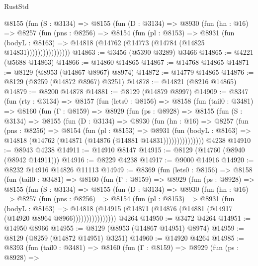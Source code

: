 \begin{lexlean}{RustStd}
\begin{coremodule}
              @8155
                (fun (S : @3134) =>
                @8155
                  (fun (D : @3134) =>
                  @8930
                    (fun (hn : @16) =>
                    @8257
                      (fun (pns : @8256) =>
                      @8154
                        (fun (pl : @8153) =>
                        @8931
                          (fun (bodyL : @8163) =>
                          @14818 (@14762 (@14773 (@14784 (@14825 @14831))))))))))))))))
@14863 := @3456 (@5390 @3289) @3466
@14865 := @4221 (@5688 @14863)
@14866 := @14860 @14865
@14867 := @14768 @14865
@14871 := @8129 (@8953 (@14867 @8967) @8974)
@14872 := @14779 @14865
@14876 := @8129 (@8259 (@14872 @8967) @3251)
@14878 := @14821 (@8216 @14865)
@14879 := @8200 @14878
@14881 := @8129 (@14879 @8997)
@14909 := @8347
    (fun (rty : @3134) =>
    @8157
      (fun (lets0 : @8156) =>
      @8158
        (fun (tail0 : @3481) =>
        @8160
          (fun (Γ : @8159) =>
          @8929
            (fun (ps : @8928) =>
            @8155
              (fun (S : @3134) =>
              @8155
                (fun (D : @3134) =>
                @8930
                  (fun (hn : @16) =>
                  @8257
                    (fun (pns : @8256) =>
                    @8154
                      (fun (pl : @8153) =>
                      @8931
                        (fun (bodyL : @8163) =>
                        @14818 (@14762 (@14871 (@14876 (@14881 @14831)))))))))))))))
    @4238
@14910 := @8943 @4238
@14911 := @14910 @8147
@14915 := @8129 (@14760 (@8940 (@8942 @14911)))
@14916 := @8229 @4238
@14917 := @9000 @14916
@14920 := @8232 @14916 @14826 @11113
@14949 := @8369
    (fun (lets0 : @8156) =>
    @8158
      (fun (tail0 : @3481) =>
      @8160
        (fun (Γ : @8159) =>
        @8929
          (fun (ps : @8928) =>
          @8155
            (fun (S : @3134) =>
            @8155
              (fun (D : @3134) =>
              @8930
                (fun (hn : @16) =>
                @8257
                  (fun (pns : @8256) =>
                  @8154
                    (fun (pl : @8153) =>
                    @8931
                      (fun (bodyL : @8163) =>
                      @14818
                        (@14915 (@14871 (@14876 (@14881 (@14917 (@14920 @8964 @8966))))))))))))))))
    @4264
@14950 := @3472 @4264
@14951 := @14950 @8966
@14955 := @8129 (@8953 (@14867 @14951) @8974)
@14959 := @8129 (@8259 (@14872 @14951) @3251)
@14960 := @14920 @4264
@14985 := @8393
    (fun (tail0 : @3481) =>
    @8160
      (fun (Γ : @8159) =>
      @8929
        (fun (ps : @8928) =>

\end{coremodule}
\end{lexlean}
